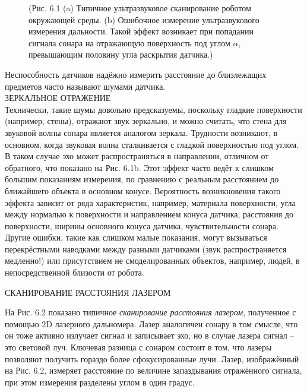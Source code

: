 \documentclass[10pt,a4paper]{article}
\begin{document}
\begin{figure}[H]
	\caption{ (Рис. 6.1 (a) Типичное ультразвуковое сканирование роботом окружающей среды. (b) Ошибочное измерение ультразвукового измерения дальности. Такой эффект возникает при попадании сигнала сонара на отражающую поверхность под углом $\alpha$, превышающим половину угла раскрытия датчика.)}
	\label{fig:61orig}
\end{figure}

Неспособность датчиков надёжно измерить расстояние до близлежащих предметов часто называют шумами датчика.\\
ЗЕРКАЛЬНОЕ ОТРАЖЕНИЕ\\ 
Технически, такие шумы довольно предсказуемы, поскольку гладкие поверхности (например, стены), отражают звук зеркально, и можно считать, что стена для звуковой волны сонара является аналогом зеркала. Трудности возникают, в основном, когда звуковая волна сталкивается с гладкой поверхностью под углом. В таком случае эхо может распространяться в направлении, отличном от обратного, что показано на Рис. 6.1b. Этот эффект часто ведёт к слишком большим показаниям измерения, по сравнению с реальным расстоянием до ближайшего объекта в основном конусе. Вероятность возникновения такого эффекта зависит от ряда характеристик, например, материала поверхности, угла между нормалью к поверхности и направлением конуса датчика, расстояния до поверхности, ширины основного конуса датчика, чувствительности сонара. Другие ошибки, такие как слишком малые показания, могут вызываться перекрёстными наводками между разными датчиками (звук распространяется медленно!) или присутствием не смоделированных объектов, например, людей, в непосредственной близости от робота. 

СКАНИРОВАНИЕ РАССТОЯНИЯ ЛАЗЕРОМ
 
На Рис. 6.2 показано типичное \textit{сканирование расстояния лазером}, полученное с помощью 2D лазерного дальномера. Лазер аналогичен сонару в том смысле, что он тоже активно излучает сигнал и записывает эхо, но в случае лазера сигнал – это световой луч. Ключевая разница с сонаром состоит в том, что лазеры позволяют получить гораздо более сфокусированные лучи. Лазер, изображённый на Рис. 6.2, измеряет расстояние по величине запаздывания отражённого сигнала, при этом измерения разделены углом в один градус. 
\end{document}
